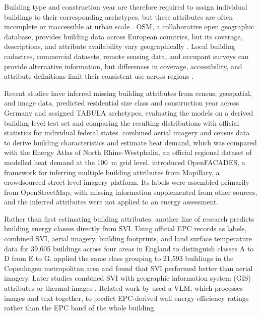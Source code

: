 Building type and construction year are therefore required to assign individual buildings to their corresponding archetypes, but these attributes are often incomplete or inaccessible at urban scale \parencite{milojevicdupont2023,dabrock2025}. \Ac{OSM}, a collaborative open geographic database, provides building data across European countries, but its coverage, descriptions, and attribute availability vary geographically \parencite{milojevicdupont2023}. Local building cadastres, commercial datasets, remote sensing data, and occupant surveys can provide alternative information, but differences in coverage, accessibility, and attribute definitions limit their consistent use across regions \parencite{dabrock2025}.

Recent studies have inferred missing building attributes from census, geospatial, and image data. \textcite{dabrock2025} predicted residential size class and construction year across Germany and assigned TABULA archetypes, evaluating the models on a derived building-level test set and comparing the resulting distributions with official statistics for individual federal states. \textcite{wurm2021} combined aerial imagery and census data to derive building characteristics and estimate heat demand, which was compared with the Energy Atlas of North Rhine-Westphalia, an official regional dataset of modelled heat demand at the 100~m grid level. \textcite{liang2025} introduced OpenFACADES, a framework for inferring multiple building attributes from Mapillary, a crowdsourced street-level imagery platform. Its labels were assembled primarily from OpenStreetMap, with missing information supplemented from other sources, and the inferred attributes were not applied to an energy assessment.

Rather than first estimating building attributes, another line of research predicts building energy classes directly from \acf{SVI}. Using official \acf{EPC} records as labels, \textcite{mayer2023uk} combined \ac{SVI}, aerial imagery, building footprints, and land surface temperature data for 39,605 buildings across four areas in England to distinguish classes A to D from E to G. \textcite{mayer2023dk} applied the same class grouping to 21,593 buildings in the Copenhagen metropolitan area and found that \ac{SVI} performed better than aerial imagery. Later studies combined \ac{SVI} with geographic information system (GIS) attributes or thermal images \parencite{liu2025,sun2026}. Related work by \textcite{pan_nd} used a \ac{VLM}, which processes images and text together, to predict EPC-derived wall energy efficiency ratings rather than the EPC band of the whole building.


